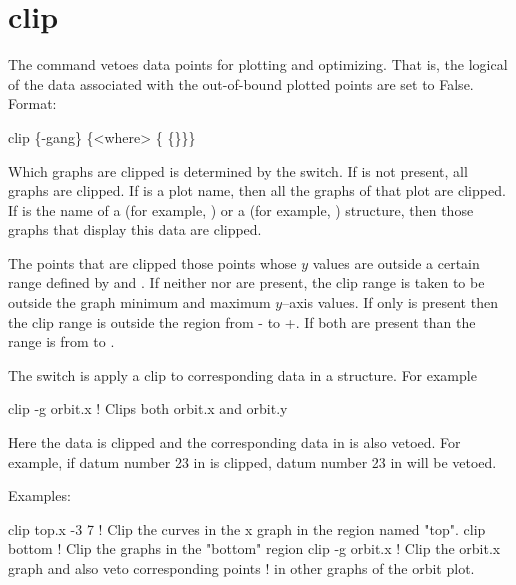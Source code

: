 \section{clip}
\label{s:clip}

The  command vetoes data points for plotting and optimizing. That is, the
 logical of the data associated with the out-of-bound plotted points are set
to False.  Format:
\begin{example}
  clip \{-gang\} \{<where> \{<limit1> \{<limit2>\}\}\}
\end{example}

\vskip 10pt 

Which graphs are clipped is determined by the  switch. If  is not
present, all graphs are clipped. If  is a plot name, then all the graphs of that
plot are clipped. If  is the name of a  (for example, ) or
a  (for example, ) structure, then those graphs that display this
data are clipped.

The points that are clipped those points whose $y$ values are outside a certain range
defined by  and . If neither  nor  are
present, the clip range is taken to be outside the graph minimum and maximum $y$--axis
values. If only  is present then the clip range is outside the region from
- to +. If both are present than the range is from 
to .

The  switch is apply a clip to corresponding data in a  structure.
For example
\begin{example}
  clip -g orbit.x   ! Clips both orbit.x and orbit.y 
\end{example}
Here the  data is clipped and the corresponding data in  is also
vetoed. For example, if datum number 23 in  is clipped, datum number 23 in
 will be vetoed.

Examples:
\begin{example}
  clip top.x -3  7  ! Clip the curves in the x graph in the region named "top".
  clip bottom       ! Clip the graphs in the "bottom" region
  clip -g orbit.x   ! Clip the orbit.x graph and also veto corresponding points
                    ! in other graphs of the orbit plot.
\end{example}

